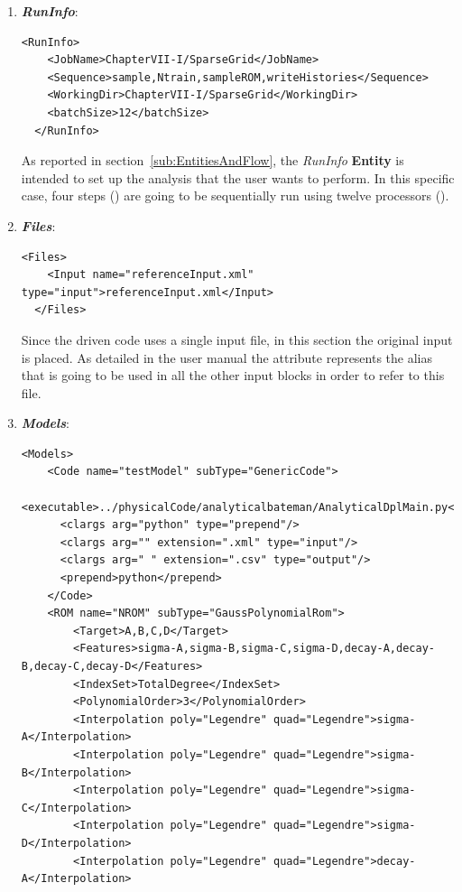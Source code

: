 \begin{enumerate}
   \item \textbf{\textit{RunInfo}}:
\begin{lstlisting}[style=XML,morekeywords={arg,extension,pauseAtEnd,overwrite}]
  <RunInfo>
    <JobName>ChapterVII-I/SparseGrid</JobName>
    <Sequence>sample,Ntrain,sampleROM,writeHistories</Sequence>
    <WorkingDir>ChapterVII-I/SparseGrid</WorkingDir>
    <batchSize>12</batchSize>
  </RunInfo>
\end{lstlisting}   
   As reported in section~\ref{sub:EntitiesAndFlow}, the \textit{RunInfo} \textbf{Entity} is intended to set up the analysis 
   that the user wants to perform. In this specific case, four steps () are going to be sequentially run 
   using twelve processors (). 
   \item \textbf{\textit{Files}}:
\begin{lstlisting}[style=XML,morekeywords={arg,extension,pauseAtEnd,overwrite}]
  <Files>
    <Input name="referenceInput.xml" type="input">referenceInput.xml</Input>
  </Files>
\end{lstlisting}
   Since the driven code uses a single input file, in this section the original input is placed. As detailed in the user manual
   the attribute   represents the alias that is going to be used in all the other input blocks in order to refer to this file.
   \item \textbf{\textit{Models}}:
\begin{lstlisting}[style=XML,morekeywords={arg,extension,pauseAtEnd,overwrite}]
  <Models>
    <Code name="testModel" subType="GenericCode">
      <executable>../physicalCode/analyticalbateman/AnalyticalDplMain.py</executable>
      <clargs arg="python" type="prepend"/>
      <clargs arg="" extension=".xml" type="input"/>
      <clargs arg=" " extension=".csv" type="output"/>
      <prepend>python</prepend>
    </Code>
    <ROM name="NROM" subType="GaussPolynomialRom">
        <Target>A,B,C,D</Target>
        <Features>sigma-A,sigma-B,sigma-C,sigma-D,decay-A,decay-B,decay-C,decay-D</Features>
        <IndexSet>TotalDegree</IndexSet>
        <PolynomialOrder>3</PolynomialOrder>
        <Interpolation poly="Legendre" quad="Legendre">sigma-A</Interpolation>
        <Interpolation poly="Legendre" quad="Legendre">sigma-B</Interpolation>
        <Interpolation poly="Legendre" quad="Legendre">sigma-C</Interpolation>
        <Interpolation poly="Legendre" quad="Legendre">sigma-D</Interpolation>
        <Interpolation poly="Legendre" quad="Legendre">decay-A</Interpolation>

\end{lstlisting}
\end{enumerate}
